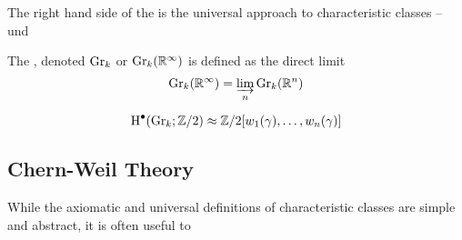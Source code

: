 The right hand side of the  is the universal approach to characteristic classes -- und

\begin{definition}
	The , denoted $\mathrm{Gr}_k$ or $\mathrm{Gr}_k(\mathbb{R}^\infty)$ is defined as the direct limit
	\[
		\mathrm{Gr}_k(\mathbb{R}^\infty) = \varinjlim_n \mathrm{Gr}_k(\mathbb{R}^n)
	\]
\end{definition}

\begin{theorem}
	\[
		\operatorname{H}^\bullet(\mathrm{Gr}_k; \mathbb{Z}/2) \approx \mathbb{Z}/2[w_1(\gamma), \ldots, w_n(\gamma)]
	\]
\end{theorem}

\subsection{Chern-Weil Theory}\label{sec:chern-weil-theory}

While the axiomatic and universal definitions of characteristic classes are simple and abstract, it is often useful to

